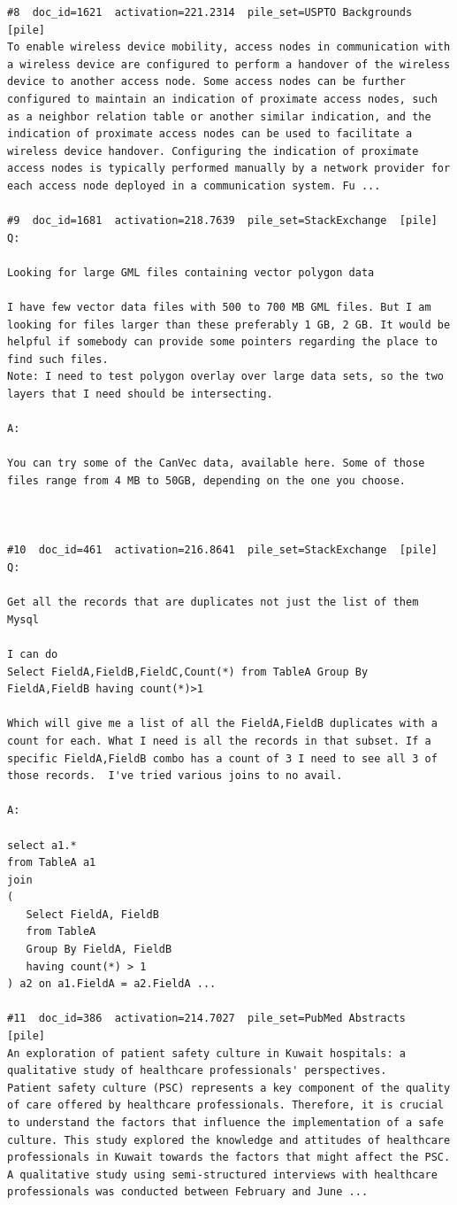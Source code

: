 \begin{verbatim}
#8  doc_id=1621  activation=221.2314  pile_set=USPTO Backgrounds  [pile]
To enable wireless device mobility, access nodes in communication with a wireless device are configured to perform a handover of the wireless device to another access node. Some access nodes can be further configured to maintain an indication of proximate access nodes, such as a neighbor relation table or another similar indication, and the indication of proximate access nodes can be used to facilitate a wireless device handover. Configuring the indication of proximate access nodes is typically performed manually by a network provider for each access node deployed in a communication system. Fu ...

#9  doc_id=1681  activation=218.7639  pile_set=StackExchange  [pile]
Q:

Looking for large GML files containing vector polygon data

I have few vector data files with 500 to 700 MB GML files. But I am looking for files larger than these preferably 1 GB, 2 GB. It would be helpful if somebody can provide some pointers regarding the place to find such files.
Note: I need to test polygon overlay over large data sets, so the two layers that I need should be intersecting.

A:

You can try some of the CanVec data, available here. Some of those files range from 4 MB to 50GB, depending on the one you choose.



#10  doc_id=461  activation=216.8641  pile_set=StackExchange  [pile]
Q:

Get all the records that are duplicates not just the list of them Mysql

I can do
Select FieldA,FieldB,FieldC,Count(*) from TableA Group By FieldA,FieldB having count(*)>1

Which will give me a list of all the FieldA,FieldB duplicates with a count for each. What I need is all the records in that subset. If a specific FieldA,FieldB combo has a count of 3 I need to see all 3 of those records.  I've tried various joins to no avail.

A:

select a1.* 
from TableA a1
join
(
   Select FieldA, FieldB
   from TableA 
   Group By FieldA, FieldB 
   having count(*) > 1
) a2 on a1.FieldA = a2.FieldA ...

#11  doc_id=386  activation=214.7027  pile_set=PubMed Abstracts  [pile]
An exploration of patient safety culture in Kuwait hospitals: a qualitative study of healthcare professionals' perspectives.
Patient safety culture (PSC) represents a key component of the quality of care offered by healthcare professionals. Therefore, it is crucial to understand the factors that influence the implementation of a safe culture. This study explored the knowledge and attitudes of healthcare professionals in Kuwait towards the factors that might affect the PSC. A qualitative study using semi-structured interviews with healthcare professionals was conducted between February and June ...


\end{verbatim}
